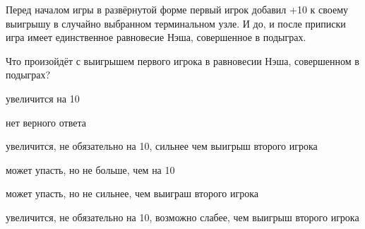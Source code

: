 
\begin{question}
Перед началом игры в развёрнутой форме первый игрок добавил +10 к своему выигрышу
в случайно выбранном терминальном узле. И до, и после приписки игра имеет единственное равновесие Нэша, совершенное в подыграх.

Что произойдёт с выигрышем первого игрока в равновесии Нэша, совершенном в подыграх?
\begin{answerlist}
  \item увеличится на 10
  \item нет верного ответа
  \item увеличится, не обязательно на 10, сильнее чем выигрыш второго игрока
  \item может упасть, но не больше, чем на 10
  \item может упасть, но не сильнее, чем выиграш второго игрока
  \item увеличится, не обязательно на 10, возможно слабее, чем выигрыш второго игрока
\end{answerlist}
\end{question}


